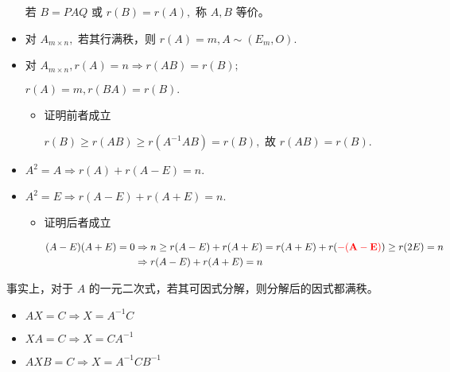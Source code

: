 \begin{itemize}
    若 $ B = PAQ $ 或 $ r(B) = r(A), $ 称 $ A,B $ 等价。
    \item 对 $ A_{m\times n}, $ 若其行满秩，则 $ r(A) = m, A\sim (E_m,O). $ 
    \item 对 $ A_{m\times n}, r(A) = n \Rightarrow r(AB) = r(B); $ 

    $ r(A) = m, r(BA) = r(B). $ 
    \begin{itemize}
        \item 证明前者成立
        
        $ r(B)\geq r(AB) \geq r(A^{-1} AB) = r(B), $ 故 $ r(AB) = r(B). $ 
    \end{itemize}
\end{itemize}


\begin{itemize}
    \item $ A^2 = A \Rightarrow r(A) + r(A-E) = n. $ 
    \item $ A^2 = E \Rightarrow r(A - E) + r(A + E) = n. $ 
    \begin{itemize}
        \item 证明后者成立
        
        \begin{equation*}
            \begin{aligned}
                (A-E)(A+E)= 0 &\Rightarrow  n \geq r(A-E) + r(A+E) = r(A+E) + r(\textcolor{red}{\bf{-(A-E)}}) \geq r(2E) = n
                \\ &\Rightarrow r(A-E) + r(A+E) = n
            \end{aligned}
        \end{equation*}
    \end{itemize}
\end{itemize}

事实上，对于 $ A $ 的一元二次式，若其可因式分解，则分解后的因式都满秩。



\begin{itemize}
    \item $ AX = C\Rightarrow X = A^{-1}C $ 
    \item $ XA = C\Rightarrow X = CA^{-1} $ 
    \item $ AXB = C\Rightarrow X = A^{-1}CB^{-1} $ 
\end{itemize}


